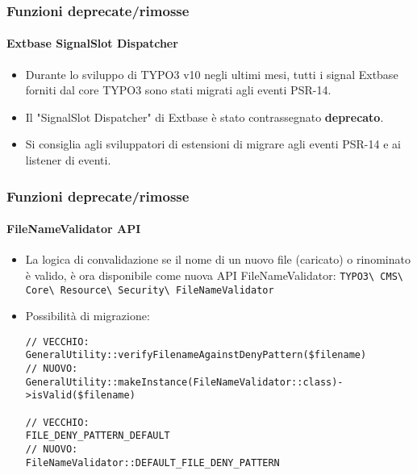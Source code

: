 \begin{frame}[fragile]
	\frametitle{Funzioni deprecate/rimosse}
	\framesubtitle{Extbase SignalSlot Dispatcher}

	\begin{itemize}
		\item Durante lo sviluppo di TYPO3 v10 negli ultimi mesi,
		    tutti i signal Extbase forniti dal core TYPO3 sono stati migrati agli eventi PSR-14.
		\item Il "SignalSlot Dispatcher" di Extbase è stato contrassegnato \textbf{deprecato}.
		\item Si consiglia agli sviluppatori di estensioni di migrare agli eventi PSR-14 e ai listener di eventi.
	\end{itemize}

\end{frame}


\begin{frame}[fragile]
	\frametitle{Funzioni deprecate/rimosse}
	\framesubtitle{FileNameValidator API}

	\lstset{basicstyle=\tiny\ttfamily}

	\begin{itemize}
		\item La logica di convalidazione se il nome di un nuovo file (caricato) o rinominato è valido, è ora disponibile come nuova API FileNameValidator:\newline
			\small
				\texttt{TYPO3\textbackslash
					CMS\textbackslash
					Core\textbackslash
					Resource\textbackslash
					Security\textbackslash
					FileNameValidator}
			\normalsize

		\item Possibilità di migrazione:

\begin{lstlisting}
// VECCHIO:
GeneralUtility::verifyFilenameAgainstDenyPattern($filename)
// NUOVO:
GeneralUtility::makeInstance(FileNameValidator::class)->isValid($filename)

// VECCHIO:
FILE_DENY_PATTERN_DEFAULT
// NUOVO:
FileNameValidator::DEFAULT_FILE_DENY_PATTERN
\end{lstlisting}

	\end{itemize}

\end{frame}

